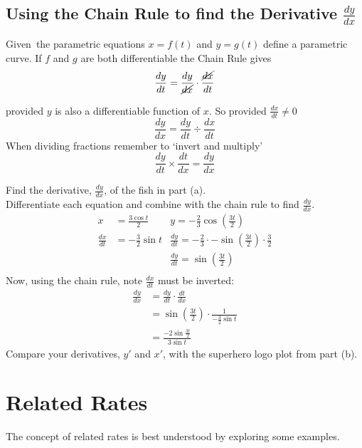 \subsection*{Using the Chain Rule to find the Derivative $\frac{d y}{d x}$}
Given\ the parametric equations $x =f (t)$ and $y =g (t)$ define a parametric curve. If $f$ and $g$ are both differentiable the Chain Rule gives
\begin{equation*}\frac{d y}{d t} =\frac{d y}{\cancel{d x}} \cdot \frac{\cancel{d x}}{d t}
\end{equation*}

provided $y$ is also a differentiable function of $x$. So provided $\frac{d x}{d t} \neq 0$
\[\frac{d y}{d x} = \frac{d y}{d t} \div \frac{d x}{d t}\]
When dividing fractions remember to `invert and multiply'\\
\[\frac{d y}{d t} \times \frac{d t}{d x}=\frac{dy}{dx}\]

\example Find the derivative, $\frac{dy}{dx}$, of the fish in part (a).\medskip\\
\solution Differentiate each equation and combine with the chain rule to find $\frac{dy}{dx}$.\\
\begin{align*}x&=\frac{3\cos t}{2} &y=-\frac{2}{3}\cos\left({\frac{3t}{2}}\right)\\
\frac{dx}{dt}&=-\frac{3}{2}\sin t &\frac{dy}{dt}=-\frac{2}{3}\cdot-\sin \left({\frac{3t}{2}}\right)\cdot\frac{3}{2}\\
&&\frac{dy}{dt}=\sin \left({\frac{3t}{2}}\right)\\
\end{align*}
Now, using the chain rule, note $\frac{dx}{dt}$ must be inverted:\\
\begin{align*}\frac{dy}{dx}&=\frac{dy}{dt}\cdot\frac{dt}{dx}\\
&=\sin \left({\frac{3t}{2}}\right)\cdot \frac{1}{-\frac{3}{2}\sin t }\\
&=\frac{-2\sin \frac{3t}{2}}{3\sin t}
\end{align*}
Compare your derivatives, $y'$ and $x'$, with the superhero logo plot from part (b).
\section{Related Rates}
The concept of related rates is best understood by exploring some examples.

